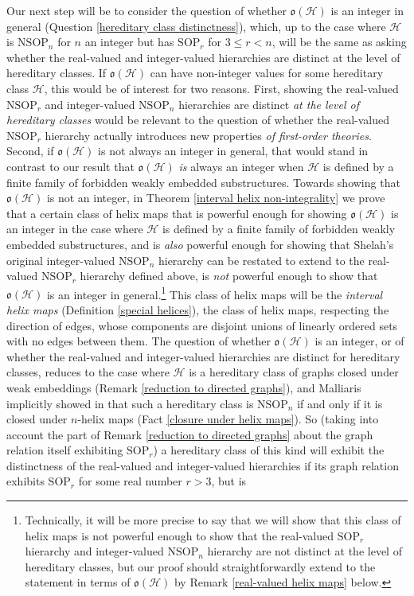 \documentclass{amsart}
\theoremstyle{definition}
\theoremstyle{remark}
\numberwithin{equation}{section}
\begin{document}
Our next step will be to consider the question of whether $\mathfrak{o}(\mathcal{H})$ is an integer in general (Question \ref{hereditary class distinctness}), which, up to the case where $\mathcal{H}$ is $\mathrm{NSOP}_{n}$ for $n$ an integer but has $\mathrm{SOP}_{r}$ for $3 \leq r < n$, will be the same as asking whether the real-valued and integer-valued hierarchies are distinct at the level of hereditary classes. If $\mathfrak{o}(\mathcal{H})$ can have non-integer values for some hereditary class $\mathcal{H}$, this would be of interest for two reasons. First, showing the real-valued $\mathrm{NSOP}_{r}$ and integer-valued $\mathrm{NSOP}_{n}$ hierarchies are distinct \textit{at the level of hereditary classes} would be relevant to the question of whether the real-valued $\mathrm{NSOP}_{r}$ hierarchy actually introduces new properties \textit{of first-order theories}. Second, if $\mathfrak{o}(\mathcal{H})$ is not always an integer in general, that would stand in contrast to our result that $\mathfrak{o}(\mathcal{H})$ \textit{is} always an integer when $\mathcal{H}$ is defined by a finite family of forbidden weakly embedded substructures. Towards showing that $\mathfrak{o}(\mathcal{H})$ is not an integer, in Theorem \ref{interval helix non-integrality} we prove that a certain class of helix maps that is powerful enough for showing $\mathfrak{o}(\mathcal{H})$ is an integer in the case where $\mathcal{H}$ is defined by a finite family of forbidden weakly embedded substructures, and is \textit{also} powerful enough for showing that Shelah's original integer-valued $\mathrm{NSOP}_{n}$ hierarchy can be restated to extend to the real-valued $\mathrm{NSOP}_{r}$ hierarchy defined above, is \textit{not} powerful enough to show that $\mathfrak{o}(\mathcal{H})$ is an integer in general.\footnote{Technically, it will be more precise to say that we will show that this class of helix maps is not powerful enough to show that the real-valued $\mathrm{SOP}_{r}$ hierarchy and integer-valued $\mathrm{NSOP}_{n}$ hierarchy are not distinct at the level of hereditary classes, but our proof should straightforwardly extend to the statement in terms of $\mathfrak{o}(\mathcal{H})$ by Remark \ref{real-valued helix maps} below.} This class of helix maps will be the \textit{interval helix maps} (Definition \ref{special helices}), the class of helix maps, respecting the direction of edges, whose components are disjoint unions of linearly ordered sets with no edges between them. The question of whether $\mathfrak{o}(\mathcal{H})$ is an integer, or of whether the real-valued and integer-valued hierarchies are distinct for hereditary classes, reduces to the case where $\mathcal{H}$ is a hereditary class of graphs closed under weak embeddings (Remark \ref{reduction to directed graphs}), and Malliaris implicitly showed in \cite{Mal10b} that such a hereditary class is $\mathrm{NSOP}_{n}$ if and only if it is closed under $n$-helix maps (Fact \ref{closure under helix maps}). So (taking into account the part of Remark \ref{reduction to directed graphs} about the graph relation itself exhibiting $\mathrm{SOP}_{r}$) a hereditary class of this kind will exhibit the distinctness of the real-valued and integer-valued hierarchies if its graph relation exhibits $\mathrm{SOP}_{r}$ for some real number $r > 3$, but is 
\end{document}
